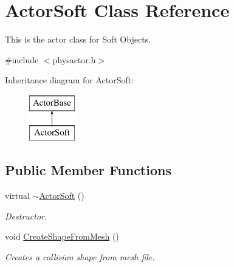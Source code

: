 \hypertarget{classActorSoft}{
\section{ActorSoft Class Reference}
\label{d5/da4/classActorSoft}
}


This is the actor class for Soft Objects.  




{\ttfamily \#include $<$physactor.h$>$}

Inheritance diagram for ActorSoft:\begin{figure}[H]
\begin{center}
\leavevmode
\includegraphics[height=2cm]{d5/da4/classActorSoft}
\end{center}
\end{figure}
\subsection*{Public Member Functions}
\begin{DoxyCompactItemize}
\item 
virtual \hyperlink{classActorSoft_af58881c064fa2182a2347eb8755696b0}{$\sim$ActorSoft} ()
\begin{DoxyCompactList}\small\item\em Destructor. \item\end{DoxyCompactList}\item 
void \hyperlink{classActorSoft_a55ac461f317aed2b812f07eb384b2a6d}{CreateShapeFromMesh} ()
\begin{DoxyCompactList}\small\item\em Creates a collision shape from mesh file. \item\end{DoxyCompactList}\end{DoxyCompactItemize}
